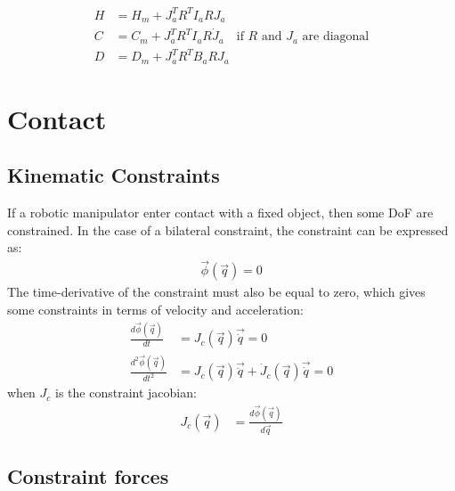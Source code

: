 \begin{align}
H   &= H_m + J_a^T R^T I_a R J_a        \\
C   &= C_m + J_a^T R^T I_a R \dot{J}_a \quad \text{if $R$ and $J_a$ are diagonal} \\
D   &= D_m + J_a^T R^T B_a R J_a 
\label{eq:coord_transform}
\end{align}


\section{Contact}
\label{sec:contact}

\subsection{Kinematic Constraints}
\label{sec:constraints}
%
If a robotic manipulator enter contact with a fixed object, then some DoF are constrained. In the case of a bilateral constraint, the constraint can be expressed as:
\begin{align}
\vec{\phi}( \vec{ q } ) = 0
\label{eq:constraint}
\end{align}
%
The time-derivative of the constraint must also be equal to zero, which gives some constraints in terms of velocity and acceleration:
\begin{align}
\frac{d \vec{\phi}( \vec{ q } ) }{dt}     &= J_c( \vec{ q } ) \vec{\dot{q}}  = 0 \\
\frac{d^2 \vec{\phi}( \vec{ q } ) }{dt^2} &= J_c( \vec{ q } ) \vec{\ddot{q}}  + \dot{J}_c( \vec{ q } ) \vec{\dot{q}} = 0 
\label{eq:constraint_diff}
\end{align}
%
when $J_c$ is the constraint jacobian:
%
\begin{align}
J_c( \vec{ q } )                    &= \frac{d \vec{\phi}( \vec{ q } ) }{d\vec{ q }}
\label{eq:constraint_jaco}
\end{align}

\subsection{Constraint forces}
\label{sec:constraint_forces}

